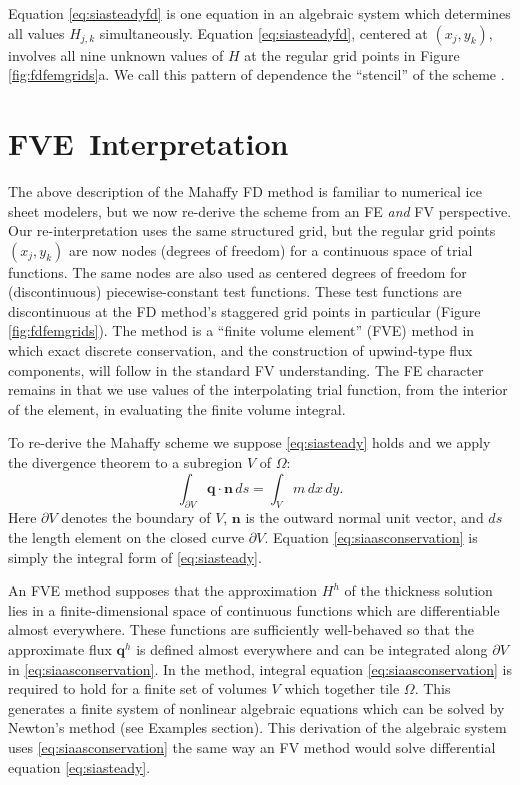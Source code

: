 \documentclass[twocolumn,letterpaper]{igs}
\newcommand\bn{\mathbf{n}}
\newcommand\bq{\mathbf{q}}
\begin{document}
Equation \eqref{eq:siasteadyfd} is one equation in an algebraic system which determines all values $H_{j,k}$ simultaneously.  Equation \eqref{eq:siasteadyfd}, centered at $(x_j,y_k)$, involves all nine unknown values of $H$ at the regular grid points in Figure \ref{fig:fdfemgrids}a.  We call this pattern of dependence the ``stencil'' of the scheme \citep{MortonMayers2005}.


\section{FVE\, Interpretation} \label{sec:fveinterpretation}

The above description of the Mahaffy FD method is familiar to numerical ice sheet modelers, but we now re-derive the scheme from an FE \emph{and} FV perspective.  Our re-interpretation uses the same structured grid, but the regular grid points $(x_j,y_k)$ are now nodes (degrees of freedom) for a continuous space of trial functions.  The same nodes are also used as centered degrees of freedom for (discontinuous) piecewise-constant test functions.  These test functions are discontinuous at the FD method's staggered grid points in particular (Figure \ref{fig:fdfemgrids}).  The method is a ``finite volume element'' (FVE) method in which exact discrete conservation, and the construction of upwind-type flux components, will follow in the standard FV understanding.  The FE character remains in that we use values of the interpolating trial function, from the interior of the element, in evaluating the finite volume integral.

To re-derive the Mahaffy scheme we suppose \eqref{eq:siasteady} holds and we apply the divergence theorem to a subregion $V$ of $\Omega$:
\begin{equation}
  \int_{\partial V} \bq \cdot \bn\,ds = \int_V m\, dx\,dy. \label{eq:siaasconservation}
\end{equation}
Here $\partial V$ denotes the boundary of $V$, $\bn$ is the outward normal unit vector, and $ds$ the length element on the closed curve $\partial V$.  Equation \eqref{eq:siaasconservation} is simply the integral form of \eqref{eq:siasteady}.

An FVE method supposes that the approximation $H^h$ of the thickness solution lies in a finite-dimensional space of continuous functions which are differentiable almost everywhere.  These functions are sufficiently well-behaved so that the approximate flux $\bq^h$ is defined almost everywhere and can be integrated along $\partial V$ in \eqref{eq:siaasconservation}.  In the method, integral equation \eqref{eq:siaasconservation} is required to hold for a finite set of volumes $V$ which together tile $\Omega$.  This generates a finite system of nonlinear algebraic equations which can be solved by Newton's method (see Examples section).  This derivation of the algebraic system uses \eqref{eq:siaasconservation} the same way an FV method would solve differential equation \eqref{eq:siasteady}.
\end{document}

